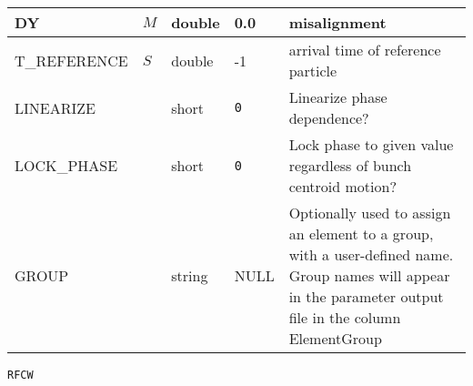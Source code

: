 \begin{tabular}{|l|l|l|l|p{\descwidth}|}
DY & $M$ & double &  0.0 & misalignment  \\ \hline 
T\_REFERENCE & $S$ & double &   -1 & arrival time of reference particle  \\ \hline 
LINEARIZE &  & short &  \verb|0| & Linearize phase dependence?  \\ \hline 
LOCK\_PHASE &  & short &  \verb|0| & Lock phase to given value regardless of bunch centroid motion?  \\ \hline 
GROUP &  & string & NULL & Optionally used to assign an element to a group, with a user-defined name.  Group names will appear in the parameter output file in the column ElementGroup  \\ \hline 
\end{tabular}

\vspace*{0.5in}

\newpage
\begin{center}{\Large\verb|RFCW|}\end{center}
